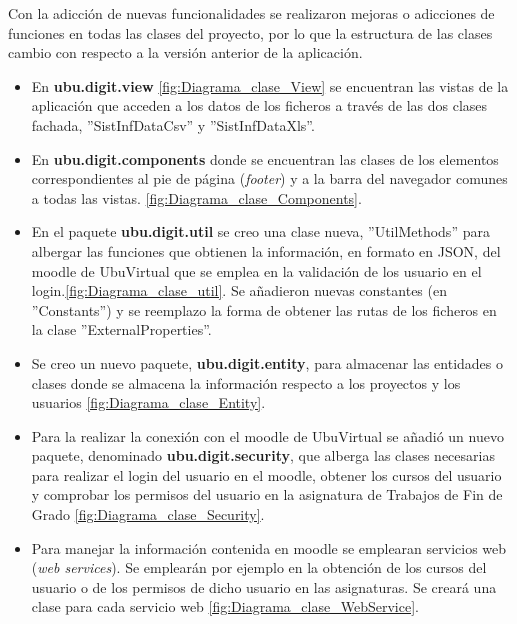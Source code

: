 Con la adicción de nuevas funcionalidades se realizaron mejoras o adicciones de funciones en todas las clases del proyecto, por lo que la estructura de las clases cambio con respecto a la versión anterior de la aplicación.
\begin{itemize}
	\tightlist
	\item En \textbf{ubu.digit.view} \ref{fig:Diagrama_clase_View} se encuentran las vistas de la aplicación que acceden a los datos de los ficheros a través de las dos clases fachada, ''SistInfDataCsv'' y  ''SistInfDataXls''.
	
	\item En \textbf{ubu.digit.components} donde se encuentran las clases de los elementos correspondientes al pie de página (\emph{footer}) y a la barra del navegador comunes a todas las vistas. \ref{fig:Diagrama_clase_Components}. 
	
		
	\item En el paquete \textbf{ubu.digit.util} se creo una clase nueva, ''UtilMethods'' para albergar las funciones que obtienen la información, en formato en JSON, del moodle de UbuVirtual que se emplea en la validación de los usuario en el login.\ref{fig:Diagrama_clase_util}. Se añadieron nuevas constantes (en ''Constants'') y se reemplazo la forma de obtener las rutas de los ficheros en la clase ''ExternalProperties''.
	
	
	\item Se creo un nuevo paquete, \textbf{ubu.digit.entity}, para almacenar las entidades o clases donde se almacena la información respecto a los proyectos y los usuarios \ref{fig:Diagrama_clase_Entity}. 
	
	
	\item Para la realizar la conexión con el moodle de UbuVirtual se añadió un nuevo paquete, denominado \textbf{ubu.digit.security}, que alberga las clases necesarias para realizar el login del usuario en el moodle, obtener los cursos del usuario y comprobar los permisos del usuario en la asignatura de Trabajos de Fin de Grado \ref{fig:Diagrama_clase_Security}. 
	
	
	\item Para manejar la información contenida en moodle se emplearan servicios web (\emph{web services}). Se emplearán por ejemplo en la obtención de los cursos del usuario o de los permisos de dicho usuario en las asignaturas. Se creará una clase para cada servicio web  \ref{fig:Diagrama_clase_WebService}.
	
\end{itemize}


